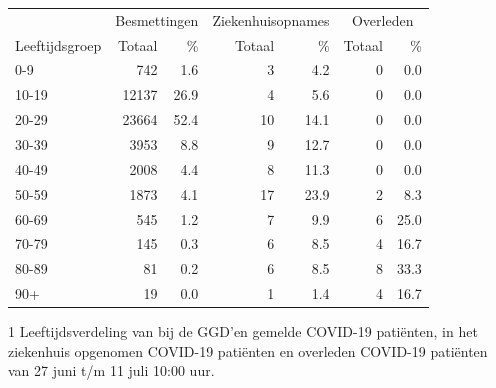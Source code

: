 \documentclass[
  english,
  man,floatsintext]{apa6}
\begin{document}
\begin{table}
\centering\begingroup\fontsize{11}{13}\selectfont

\begin{threeparttable}
\begin{tabular}{lrrrrrr}
\toprule
\multicolumn{1}{c}{ } & \multicolumn{2}{c}{Besmettingen} & \multicolumn{2}{c}{Ziekenhuisopnames} & \multicolumn{2}{c}{Overleden} \\
\cmidrule(l{3pt}r{3pt}){2-3} \cmidrule(l{3pt}r{3pt}){4-5} \cmidrule(l{3pt}r{3pt}){6-7}
Leeftijdsgroep & Totaal & \% & Totaal & \% & Totaal & \%\\
\midrule
0-9 & 742 & 1.6 & 3 & 4.2 & 0 & 0.0\\
10-19 & 12137 & 26.9 & 4 & 5.6 & 0 & 0.0\\
20-29 & 23664 & 52.4 & 10 & 14.1 & 0 & 0.0\\
30-39 & 3953 & 8.8 & 9 & 12.7 & 0 & 0.0\\
40-49 & 2008 & 4.4 & 8 & 11.3 & 0 & 0.0\\
50-59 & 1873 & 4.1 & 17 & 23.9 & 2 & 8.3\\
60-69 & 545 & 1.2 & 7 & 9.9 & 6 & 25.0\\
70-79 & 145 & 0.3 & 6 & 8.5 & 4 & 16.7\\
80-89 & 81 & 0.2 & 6 & 8.5 & 8 & 33.3\\
90+ & 19 & 0.0 & 1 & 1.4 & 4 & 16.7\\
\bottomrule
\end{tabular}
\begin{tablenotes}
\item[1] Leeftijdsverdeling van bij de GGD’en gemelde COVID-19 patiënten, in het ziekenhuis opgenomen COVID-19 patiënten en overleden COVID-19 patiënten van 27 juni t/m 11 juli 10:00 uur.
\end{tablenotes}
\end{threeparttable}
\endgroup{}
\end{table}

\newpage
\end{document}
